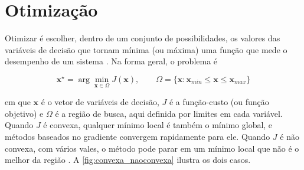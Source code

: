 \section{Otimização}
\label{sec:otimizacao_revbib}

Otimizar é escolher, dentro de um conjunto de possibilidades, os valores das
variáveis de decisão que tornam mínima (ou máxima) uma função que mede o
desempenho de um sistema \cite{nocedal2006numerical}. Na forma geral, o
problema é

\begin{equation}
    \mathbf{x}^{\star} = \arg\min_{\mathbf{x} \in \Omega} J(\mathbf{x}),
    \qquad \Omega = \{\mathbf{x} : \mathbf{x}_{min} \le \mathbf{x} \le \mathbf{x}_{max}\}
    \label{eq:problema_otimizacao}
\end{equation}

\noindent em que $\mathbf{x}$ é o vetor de variáveis de decisão, $J$ é a
função-custo (ou função objetivo) e $\Omega$ é a região de busca, aqui
definida por limites em cada variável. Quando $J$ é convexa, qualquer mínimo
local é também o mínimo global, e métodos baseados no gradiente convergem
rapidamente para ele. Quando $J$ é não convexa, com vários vales, o método pode
parar em um mínimo local que não é o melhor da região
\cite{nocedal2006numerical}. A \autoref{fig:convexa_naoconvexa} ilustra os dois casos.

